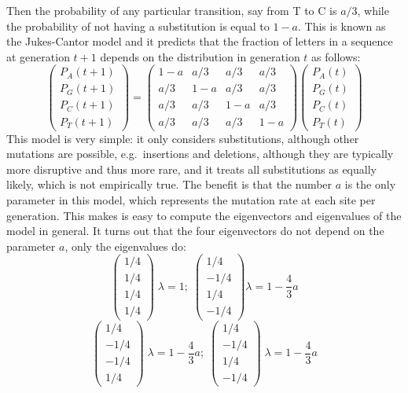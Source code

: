 \documentclass[
]{book}
\theoremstyle{definition}
\theoremstyle{definition}
\theoremstyle{definition}
\theoremstyle{remark}
\begin{document}
Then the probability of any particular transition, say from T to C is \(a/3\), while the probability of not having a substitution is equal to \(1-a\). This is known as the Jukes-Cantor model and it predicts that the fraction of letters in a sequence at generation \(t+1\) depends on the distribution in generation \(t\) as follows:
\[   \left(\begin{array}{c} P_A(t+1) \\ P_G(t+1) \\ P_C(t+1) \\ P_T(t+1) \end{array}\right) = \left(\begin{array}{cccc}1-a & a/3 & a/3 & a/3 \\a/3 & 1-a & a/3 & a/3 \\a/3 & a/3 & 1-a & a/3 \\a/3 & a/3 & a/3 & 1-a\end{array}\right) \left(\begin{array}{c} P_A(t) \\ P_G(t) \\ P_C(t) \\ P_T(t) \end{array}\right) \]
This model is very simple: it only considers substitutions, although other mutations are possible, e.g.~insertions and deletions, although they are typically more disruptive and thus more rare, and it treats all substitutions as equally likely, which is not empirically true. The benefit is that the number \(a\) is the only parameter in this model, which represents the mutation rate at each site per generation. This makes is easy to compute the eigenvectors and eigenvalues of the model in general. It turns out that the four eigenvectors do not depend on the parameter \(a\), only the eigenvalues do:
\[  \left(\begin{array}{c} 1/4 \\ 1/4 \\ 1/4 \\ 1/4 \end{array}\right) \; \lambda =1; \; \left(\begin{array}{c} 1/4 \\ -1/4 \\ 1/4 \\ -1/4 \end{array}\right) \lambda =1-\frac{4}{3}a \]
\[ \left(\begin{array}{c} 1/4 \\ -1/4 \\ -1/4 \\ 1/4 \end{array}\right) \; \lambda =1-\frac{4}{3}a;  \; \left(\begin{array}{c} 1/4 \\ -1/4 \\ 1/4 \\ -1/4 \end{array}\right) \; \lambda =1-\frac{4}{3}a\]
\end{document}
